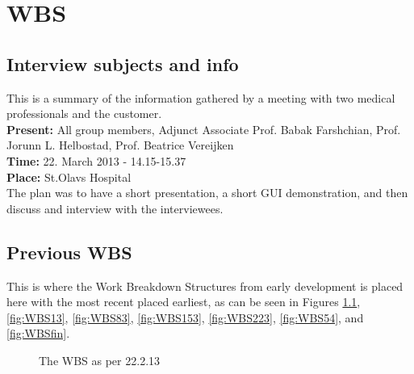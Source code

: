 
\appendix

\chapter{WBS}
\section{Interview subjects and info}
This is a summary of the information gathered by a meeting with two medical professionals and the customer.\\
\textbf{Present:} All group members, Adjunct Associate Prof. Babak Farshchian, Prof. Jorunn L. Helbostad, Prof. Beatrice Vereijken \\
\textbf{Time:} 22. March 2013 - 14.15-15.37\\
\textbf{Place:} St.Olavs Hospital\\
The plan was to have a short presentation, a short GUI demonstration, and then discuss and interview with the interviewees. \\
\section{Previous WBS}
This is where the Work Breakdown Structures from early development is placed here with the most recent placed earliest, as can be seen in Figures \ref{fig:WBS222}, \ref{fig:WBS13}, \ref{fig:WBS83}, \ref{fig:WBS153}, \ref{fig:WBS223}, \ref{fig:WBS54}, and \ref{fig:WBSfin}.

\begin{figure}[p]
\setlength\fboxsep{0pt}
\setlength\fboxrule{1pt}\noindent{}
\caption{The WBS as per 22.2.13 }
\label{fig:WBS222}
\end{figure}

